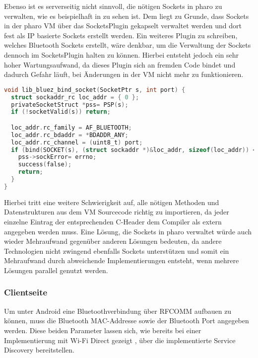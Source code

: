        Ebenso ist es serverseitig nicht sinnvoll, die nötigen Sockets in pharo zu verwalten, wie es beispielhaft in  zu sehen ist. Dem liegt zu Grunde, dass Sockets in der pharo VM über das SocketsPlugin \cite{pharoSocket} gekapselt verwaltet werden und dort fest als IP basierte Sockets erstellt werden. Ein weiteres Plugin zu schreiben, welches Bluetooth Sockets erstellt, wäre denkbar, um die Verwaltung der Sockets dennoch im SocketsPlugin halten zu können. Hierbei entsteht jedoch ein sehr hoher Wartungsaufwand, da dieses Plugin sich an fremden Code bindet und dadurch Gefahr läuft, bei Änderungen in der VM nicht mehr zu funktionieren.
        
        \begin{lstlisting}[frame=bt, label={lst:bluetooth:pharo}, language=C, caption=Pharo Bluetooth Sockets als Plugin (Servercode in C)]
void lib_bluez_bind_socket(SocketPtr s, int port) {
  struct sockaddr_rc loc_addr = { 0 };
  privateSocketStruct *pss= PSP(s);
  if (!socketValid(s)) return;

  loc_addr.rc_family = AF_BLUETOOTH;
  loc_addr.rc_bdaddr = *BDADDR_ANY;
  loc_addr.rc_channel = (uint8_t) port;
  if (bind(SOCKET(s), (struct sockaddr *)&loc_addr, sizeof(loc_addr)) < 0) {
    pss->sockError= errno;
    success(false);
    return;
  }
}
        \end{lstlisting}  
        Hierbei tritt eine weitere Schwierigkeit auf, alle nötigen Methoden und Datenstrukturen aus dem VM Sourcecode richtig zu importieren, da jeder einzelne Eintrag der entsprechenden C-Header dem Compiler als extern angegeben werden muss.
        Eine Lösung, die Sockets in pharo verwaltet würde auch wieder Mehraufwand gegenüber anderen Lösungen bedeuten, da andere Technologien nicht zwingend ebenfalls Sockets unterstützen und somit ein Mehraufwand durch abweichende Implementierungen entsteht, wenn mehrere Lösungen parallel genutzt werden.        
        
        \subsubsection{Clientseite}
        Um unter Android eine Bluetoothverbindung über RFCOMM aufbauen zu können, muss die Bluetooth MAC-Addresse sowie der Bluetooth Port angegeben werden. Diese beiden Parameter lassen sich, wie bereits bei einer Implementierung mit \linebreak Wi-Fi Direct gezeigt \cite{aiProject}, über die implementierte Service Discovery bereitstellen.
        
